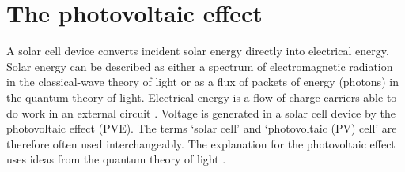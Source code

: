 \documentclass[11pt, twoside]{report}
\begin{document}



\section{The photovoltaic effect}
A solar cell device converts incident solar energy directly into electrical energy. Solar energy can be described as either a spectrum of electromagnetic radiation in the classical-wave theory of light or as a flux of packets of energy (photons) in the quantum theory of light. Electrical energy is a flow of charge carriers able to do work in an external circuit \cite{spatial_resolved_book}. Voltage is generated in a solar cell device by the photovoltaic effect (PVE). The terms `solar cell' and `photovoltaic (PV) cell' are therefore often used interchangeably. The explanation for the photovoltaic effect uses ideas from the quantum theory of light \cite{Nelson1}.
\end{document}
